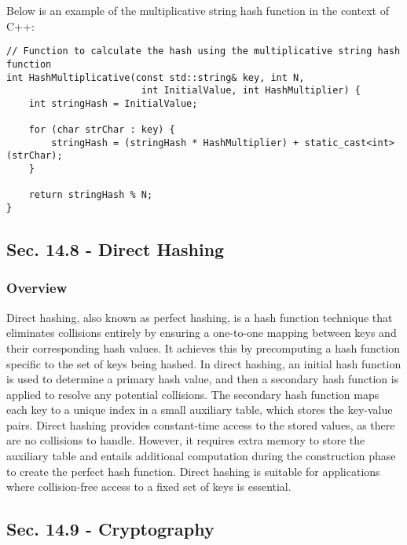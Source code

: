 \begin{solution}

Below is an example of the multiplicative string hash function in the context of C++:

\horizontalline

\begin{verbatim}
// Function to calculate the hash using the multiplicative string hash function
int HashMultiplicative(const std::string& key, int N, 
                        int InitialValue, int HashMultiplier) {
    int stringHash = InitialValue;

    for (char strChar : key) {
        stringHash = (stringHash * HashMultiplier) + static_cast<int>(strChar);
    }

    return stringHash % N;
}
\end{verbatim}

\horizontalline
    
\end{solution}

\subsection*{Sec. 14.8 - Direct Hashing}

\subsubsection{Overview}

Direct hashing, also known as perfect hashing, is a hash function technique that eliminates collisions entirely by ensuring a one-to-one mapping between keys and their corresponding hash values. It achieves this by 
precomputing a hash function specific to the set of keys being hashed. In direct hashing, an initial hash function is used to determine a primary hash value, and then a secondary hash function is applied to resolve 
any potential collisions. The secondary hash function maps each key to a unique index in a small auxiliary table, which stores the key-value pairs. Direct hashing provides constant-time access to the stored values, 
as there are no collisions to handle. However, it requires extra memory to store the auxiliary table and entails additional computation during the construction phase to create the perfect hash function. Direct hashing 
is suitable for applications where collision-free access to a fixed set of keys is essential.

\subsection*{Sec. 14.9 - Cryptography}


